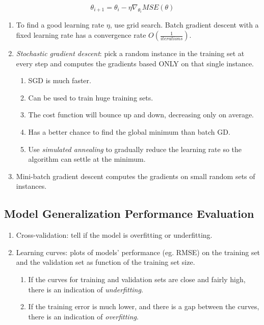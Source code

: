 \documentclass[12pt,oneside,a4paper]{article}
\numberwithin{equation}{section}
\begin{document}
\begin{equation}
\theta_{i+1} = \theta_i - \eta \nabla_{\theta_i} MSE(\theta)
\end{equation}
\begin{enumerate}
\item  To find a good learning rate $\eta$, use grid search. Batch gradient descent with a fixed learning rate has a convergence rate $O(\frac{1}{iterations})$.

\item \emph{Stochastic gradient descent}: pick a random instance in the training set at every step and computes the gradients based ONLY on that single instance. 

\begin{enumerate}
\item SGD is much faster. 
\item Can be used to train huge training sets. 
\item The cost function will bounce up and down, decreasing only on average. 
\item Has a better chance to find the global minimum than batch GD.
\item Use \emph{simulated annealing} to gradually reduce the learning rate so the algorithm can settle at the minimum.
\end{enumerate}

\item Mini-batch gradient descent computes the gradients on small random sets of instances.
\end{enumerate}

\subsection{Model Generalization Performance Evaluation}
\begin{enumerate}
\item Cross-validation: tell if the model is overfitting or underfitting.
\item Learning curves: plots of models' performance (eg. RMSE) on the training set and the validation set as function of the training set size.
\begin{enumerate}
\item If the curves for training and validation sets are close and fairly high, there is an indication of \emph{underfitting}.
\item If the training error is much lower, and there is a gap between the curves, there is an indication of \emph{overfitting}.
\end{enumerate}
\end{enumerate}
\end{document}
